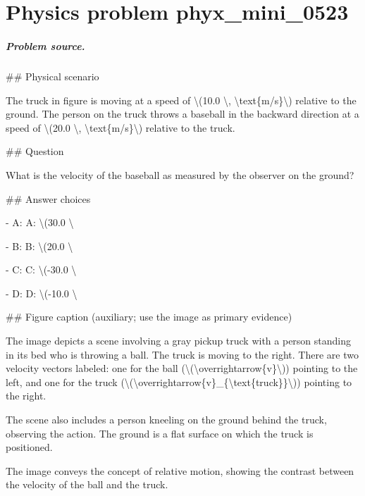 
\chapter{Physics problem phyx\_mini\_0523}
\label{ch:PhyXMiniProblems_problem_phyx_mini_0523}

\paragraph{Problem source.}
\#\# Physical scenario

The truck in figure is moving at a speed of \textbackslash{}(10.0 \textbackslash{}, \textbackslash{}text\{m/s\}\textbackslash{}) relative to the ground. The person on the truck throws a baseball in the backward direction at a speed of \textbackslash{}(20.0 \textbackslash{}, \textbackslash{}text\{m/s\}\textbackslash{}) relative to the truck.

\#\# Question

What is the velocity of the baseball as measured by the observer on the ground?

\#\# Answer choices

- A: A: \textbackslash{}(30.0 \textbackslash{}

- B: B: \textbackslash{}(20.0 \textbackslash{}

- C: C: \textbackslash{}(-30.0 \textbackslash{}

- D: D: \textbackslash{}(-10.0 \textbackslash{}

\#\# Figure caption (auxiliary; use the image as primary evidence)

The image depicts a scene involving a gray pickup truck with a person standing in its bed who is throwing a ball. The truck is moving to the right. There are two velocity vectors labeled: one for the ball (\textbackslash{}(\textbackslash{}overrightarrow\{v\}\textbackslash{})) pointing to the left, and one for the truck (\textbackslash{}(\textbackslash{}overrightarrow\{v\}\_\{\textbackslash{}text\{truck\}\}\textbackslash{})) pointing to the right. 

The scene also includes a person kneeling on the ground behind the truck, observing the action. The ground is a flat surface on which the truck is positioned.

The image conveys the concept of relative motion, showing the contrast between the velocity of the ball and the truck.

